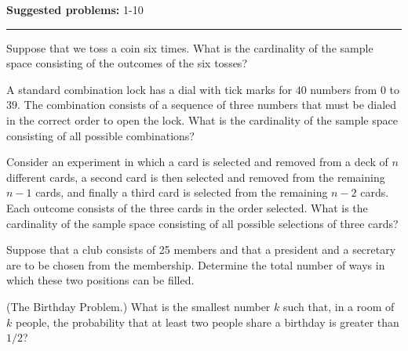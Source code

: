 \documentclass[12pt,reqno]{amsart}
\begin{document}
\textbf{Suggested problems:} 1-10

\bigskip
\hrule

\bigskip

\prob Suppose that we toss a coin six times. What is the cardinality of the sample space consisting of the outcomes of the six tosses?

\vfill
\prob A standard combination lock has a dial with tick marks for $40$ numbers from $0$ to $39$. The combination consists of a sequence of three numbers that must be dialed in the correct order to open the lock. What is the cardinality of the sample space consisting of all possible combinations?

\vfill
\prob Consider an experiment in which a card is selected and removed from a deck of $n$ different cards, a second card is then selected and removed from the remaining $n-1$ cards, and finally a third card is selected from the remaining $n-2$ cards. Each outcome consists of the three cards in the order selected. What is the cardinality of the sample space consisting of all possible selections of three cards?

\vfill
\newpage
\prob Suppose that a club consists of 25 members and that a president and a secretary are to be chosen from the membership. Determine the total number of ways in which these two positions can be filled.

\vfill
\prob (The Birthday Problem.) What is the smallest number $k$ such that, in a room of $k$ people, the probability that at least two people share a birthday is greater than $1/2$? 
\vfill
\end{document}

